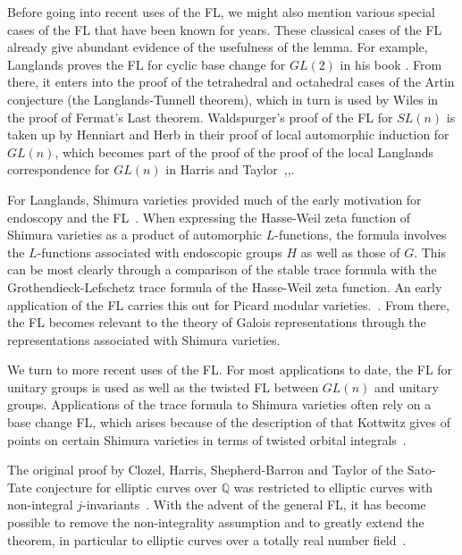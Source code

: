 \documentclass[brochure,english,12pt]{bourbaki}
\theoremstyle{plain}
\newcommand{\ring}[1]{\mathbb{#1}}
\begin{document}
Before going into recent uses of the FL, we might also mention various
special cases of the FL that have been known for years.  These classical
cases of the FL already give abundant evidence of the usefulness of
the lemma.  For example, Langlands proves the FL for
cyclic base change for $GL(2)$ in his book \cite[Lemma~5.10]{LBC:1980}.
From there, it enters into the proof of the tetrahedral and
octahedral cases of the Artin conjecture (the Langlands-Tunnell theorem),
which in turn is used by Wiles in the proof of Fermat's Last theorem.
Waldspurger's proof of the FL for $SL(n)$ is taken up by Henniart and Herb in their
proof of local automorphic induction for $GL(n)$, which becomes part of the
proof of the proof of the local Langlands correspondence for $GL(n)$
in Harris and Taylor~\cite{Wald:1991},\cite{Herb:Autoinduct},\cite{Harris:Taylor:local}.  


For Langlands, Shimura varieties provided much of the early motivation
for endoscopy and the FL~\cite{LZ:1979}.  When expressing the 
Hasse-Weil zeta function of Shimura varieties as a product of
automorphic $L$-functions, the formula involves the $L$-functions
associated with endoscopic groups $H$ as well as those of $G$.  This
can be most clearly through a comparison of the stable trace formula 
with the Grothendieck-Lefschetz trace formula of the Hasse-Weil zeta
function.
An early application of the FL carries this out for
Picard modular
varieties.~\cite{LPicard:1992}.  From there, the FL becomes relevant to the theory of Galois representations
through the representations associated with Shimura varieties.

We turn to more recent uses of the FL.  
For most applications to
date, the FL for unitary groups is used as well as the twisted FL
between $GL(n)$ and unitary groups.  Applications of the trace formula
to Shimura varieties often rely on a base change FL, which  arises
because of the description of that Kottwitz gives of points on certain
Shimura varieties in terms of twisted orbital
integrals~\cite{Kott:1990}.


The original proof by Clozel, Harris, Shepherd-Barron and Taylor
of the Sato-Tate conjecture for elliptic curves over
$\ring{Q}$ was restricted to elliptic curves with non-integral
$j$-invariants~\cite{Car:Bourbaki}.
With the advent of the general FL, it has become possible to remove
the non-integrality assumption and to greatly extend the theorem, in particular 
to elliptic curves over a totally real number field~\cite{BGHT:2010}.
\end{document}
